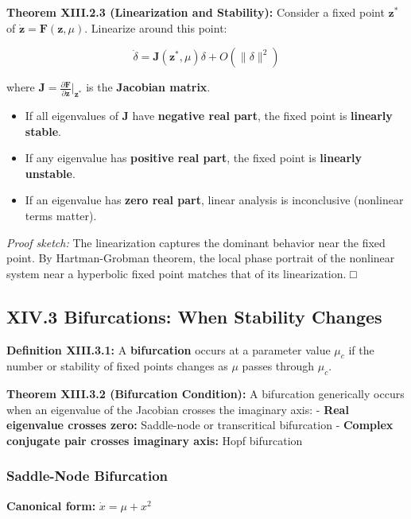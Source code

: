 \documentclass[
]{article}
\providecommand{\tightlist}{%
  \setlength{\itemsep}{0pt}\setlength{\parskip}{0pt}}
\begin{document}
\textbf{Theorem XIII.2.3 (Linearization and Stability):} Consider a
fixed point \(\mathbf{z}^*\) of
\(\dot{\mathbf{z}} = \mathbf{F}(\mathbf{z}, \mu)\). Linearize around
this point:

\[\dot{\delta} = \mathbf{J}(\mathbf{z}^*, \mu) \delta + O(\|\delta\|^2)\]

where
\(\mathbf{J} = \frac{\partial \mathbf{F}}{\partial \mathbf{z}}|_{\mathbf{z}^*}\)
is the \textbf{Jacobian matrix}.

\begin{itemize}
\tightlist
\item
  If all eigenvalues of \(\mathbf{J}\) have \textbf{negative real part},
  the fixed point is \textbf{linearly stable}.
\item
  If any eigenvalue has \textbf{positive real part}, the fixed point is
  \textbf{linearly unstable}.
\item
  If an eigenvalue has \textbf{zero real part}, linear analysis is
  inconclusive (nonlinear terms matter).
\end{itemize}

\emph{Proof sketch:} The linearization captures the dominant behavior
near the fixed point. By Hartman-Grobman theorem, the local phase
portrait of the nonlinear system near a hyperbolic fixed point matches
that of its linearization. □

\subsection{XIV.3 Bifurcations: When Stability
Changes}\label{xiv.3-bifurcations-when-stability-changes}

\textbf{Definition XIII.3.1:} A \textbf{bifurcation} occurs at a
parameter value \(\mu_c\) if the number or stability of fixed points
changes as \(\mu\) passes through \(\mu_c\).

\textbf{Theorem XIII.3.2 (Bifurcation Condition):} A bifurcation
generically occurs when an eigenvalue of the Jacobian crosses the
imaginary axis: - \textbf{Real eigenvalue crosses zero:} Saddle-node or
transcritical bifurcation - \textbf{Complex conjugate pair crosses
imaginary axis:} Hopf bifurcation

\subsubsection{Saddle-Node Bifurcation}\label{saddle-node-bifurcation}

\textbf{Canonical form:} \(\dot{x} = \mu + x^2\)
\end{document}
